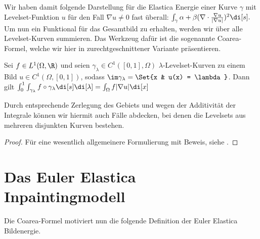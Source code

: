 \documentclass{mythesis}
\begin{document}
Wir haben damit folgende Darstellung für die Elastica Energie einer Kurve $\gamma$ mit Levelset-Funktion $u$ für den Fall $\nabla u \neq 0$ fast überall:
\begin{math}
    \int_\gamma \alpha + \beta (\nabla \cdot \frac{\nabla u}{|\nabla u|})^2 \di[s].
\end{math}
Um nun ein Funktional für das Gesamtbild zu erhalten, werden wir über alle Levelset-Kurven summieren.
Das Werkzeug dafür ist die sogenannte Coarea-Formel, welche wir hier in zurechtgeschnittener Variante präsentieren.

\begin{proposition} \label{satz:coarea}
    Sei $f \in L^1(\Omega, \R)$ und seien $\gamma_\lambda \in C^1([0,1], \Omega)$ $\lambda$-Levelset-Kurven zu einem Bild $u \in C^1(\Omega, [0,1])$, sodass $\im \gamma_\lambda = \Set{x & u(x) = \lambda}$.
    Dann gilt
    \begin{math}
	\int_0^1 \int_{\gamma_\lambda} f \circ \gamma_\lambda \di[s] \di[\lambda]
	= \int_\Omega f |\nabla u| \di[x]
    \end{math}
    \begin{note}
        Durch entsprechende Zerlegung des Gebiets und wegen der Additivität der Integrale können wir hiermit auch Fälle abdecken, bei denen die Levelsets aus mehreren disjunkten Kurven bestehen.
    \end{note}
    \begin{proof}
        Für eine wesentlich allgemeinere Formulierung mit Beweis, siehe \cite[§3.4]{evans2015measure}.
    \end{proof}
\end{proposition}


\section{Das Euler Elastica Inpaintingmodell}


Die Coarea-Formel motiviert nun die folgende Definition der Euler Elastica Bildenergie.
\end{document}
